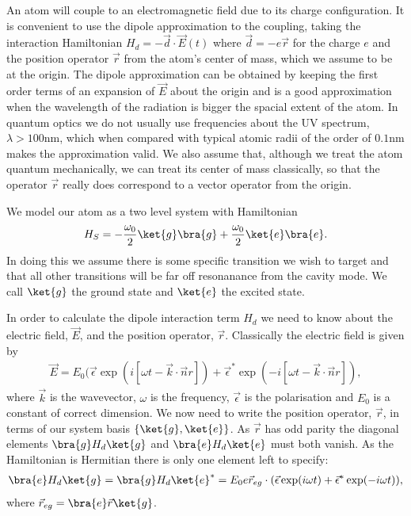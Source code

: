 An atom will couple to an electromagnetic field due to its charge configuration. It is convenient to use the dipole approximation to the coupling, taking the interaction Hamiltonian $H_d = -\vec{d}\cdot\vec{E}(t)$ where $\vec{d} = -e \vec{r}$ for the charge $e$ and the position operator $\vec{r}$ from the atom's center of mass, which we assume to be at the origin. The dipole approximation can be obtained by keeping the first order terms of an expansion of $\vec{E}$ about the origin and is a good approximation when the wavelength of the radiation is bigger the spacial extent of the atom. In quantum optics we do not usually use frequencies about the UV spectrum, $\lambda > 100\text{nm}$, which when compared with typical atomic radii of the order of $0.1\text{nm}$ makes the approximation valid. We also assume that, although we treat the atom quantum mechanically, we can treat its center of mass classically, so that the operator $\vec{r}$ really does correspond to a vector operator from the origin. 

We model our atom as a two level system with Hamiltonian
\begin{align}
  H_S = -\frac{\omega_0}{2}\ket{g}\bra{g} +\frac{\omega_0}{2}\ket{e}\bra{e}.
\end{align}
In doing this we assume there is some specific transition we wish to target and that all other transitions will be far off resonanance from the cavity mode. We call $\ket{g}$ the ground state and $\ket{e}$ the excited state. 

In order to calculate the dipole interaction term $H_d$ we need to know about the electric field, $\vec{E}$, and the position operator, $\vec{r}$. Classically the electric field is given by
\begin{align}
  \vec{E} = E_0 (\vec{\epsilon}\exp(i[\omega t - \vec{k}\cdot\vec{n}r]) + \vec{\epsilon}^*\exp(-i[\omega t - \vec{k}\cdot\vec{n}r]),
\end{align}
where $\vec{k}$ is the wavevector, $\omega$ is the frequency, $\vec{\epsilon}$ is the polarisation and $E_0$ is a constant of correct dimension.  We now need to write the position operator, $\vec{r}$, in terms of our system basis $\{\ket{g}, \ket{e}\}$. As $\vec{r}$ has odd parity the diagonal elements $\bra{g}H_d\ket{g}$ and $\bra{e}H_d\ket{e}$ must both vanish. As the Hamiltonian is Hermitian there is only one element left to specify:
\begin{align}
  \bra{e}H_d\ket{g} = \bra{g}H_d\ket{e}^* = E_0e\vec{r}_{eg}\cdot(\vec{\epsilon}\exp(i\omega t) + \vec{\epsilon}^*\exp(-i\omega t)),
\end{align}
where $\vec{r}_{eg} = \bra{e}\vec{r}\ket{g}$.

